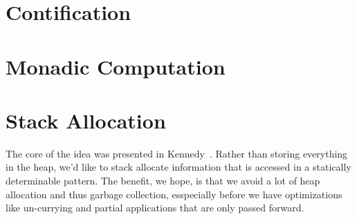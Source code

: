 \documentclass{article}
\begin{document}


\section{Contification}
\label{sec:contification}


\section{Monadic Computation}
\label{sec:mon-com}


\section{Stack Allocation}
\label{sec:stack-alloc}
The core of the idea was presented in Kennedy~\cite{kennedy07cps}. Rather than storing everything in the heap, we'd like to stack allocate information that is accessed in a statically determinable pattern. The benefit, we hope, is that we avoid a lot of heap allocation and thus garbage collection, esspecially before we have optimizations like un-currying and partial applications that are only passed forward.
\end{document}
